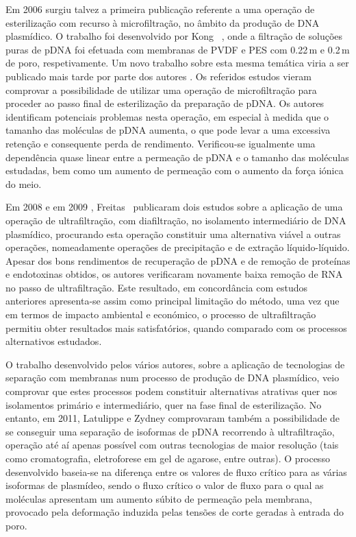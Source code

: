 Em 2006 surgiu talvez a primeira publicação referente a uma operação de esterilização com recurso à microfiltração, no âmbito da produção de DNA plasmídico. O trabalho foi desenvolvido por Kong \et\ \cite{kong06}, onde a filtração de soluções puras de pDNA foi efetuada com membranas de PVDF e PES com 0.22\,\micro m e 0.2\,\micro m de poro, respetivamente. Um novo trabalho sobre esta mesma temática viria a ser publicado mais tarde por parte dos autores \cite{kong10}. Os referidos estudos vieram comprovar a possibilidade de utilizar uma operação de microfiltração para proceder ao passo final de esterilização da preparação de pDNA. Os autores identificam potenciais problemas nesta operação, em especial à medida que o tamanho das moléculas de pDNA aumenta, o que pode levar a uma excessiva retenção e consequente perda de rendimento. Verificou-se igualmente uma dependência quase linear entre a permeação de pDNA e o tamanho das moléculas estudadas, bem como um aumento de permeação com o aumento da força iónica do meio.

Em 2008 \cite{freitasposter} e em 2009 \cite{freitas}, Freitas \et\ publicaram dois estudos sobre a aplicação de uma operação de ultrafiltração, com diafiltração, no isolamento intermediário de DNA plasmídico, procurando esta operação constituir uma alternativa viável a outras operações, nomeadamente operações de precipitação e de extração líquido-líquido. Apesar dos bons rendimentos de recuperação de pDNA e de remoção de proteínas e endotoxinas obtidos, os autores verificaram novamente baixa remoção de RNA no passo de ultrafiltração. Este resultado, em concordância com estudos anteriores \cite{kahn,duvaltff} apresenta-se assim como principal limitação do método, uma vez que em termos de impacto ambiental e económico, o processo de ultrafiltração permitiu obter resultados mais satisfatórios, quando comparado com os processos alternativos estudados.   

O trabalho desenvolvido pelos vários autores, sobre a aplicação de tecnologias de separação com membranas num processo de produção de DNA plasmídico, veio comprovar que estes processos podem constituir alternativas atrativas quer nos isolamentos primário e intermediário, quer na fase final de esterilização. No entanto, em 2011, Latulippe e Zydney \cite{zydneyiso} comprovaram também a possibilidade de se conseguir uma separação de isoformas de pDNA recorrendo à ultrafiltração, operação até aí apenas possível com outras tecnologias de maior resolução (tais como cromatografia, eletroforese em gel de agarose, entre outras). O processo desenvolvido baseia-se na diferença entre os valores de fluxo crítico para as várias isoformas de plasmídeo, sendo o fluxo crítico o valor de fluxo para o qual as moléculas apresentam um aumento súbito de permeação pela membrana, provocado pela deformação induzida pelas tensões de corte geradas à entrada do poro. 

